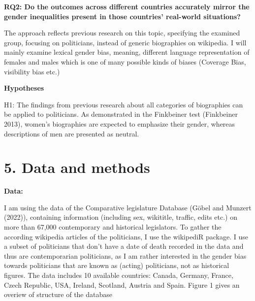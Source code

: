 \documentclass[
]{article}
\begin{document}
\textbf{RQ2: Do the outcomes across different countries accurately
mirror the gender inequalities present in those countries' real-world
situations?}

The approach reflects previous research on this topic, specifying the
examined group, focusing on politicians, instead of generic biographies
on wikipedia. I will mainly examine lexical gender bias, meaning,
different language representation of females and males which is one of
many possible kinds of biases (Coverage Bias, visibility bias etc.)

\textbf{Hypotheses}

H1: The findings from previous research about all categories of
biographies can be applied to politicians. As demonstrated in the
Finkbeiner test (Finkbeiner 2013), women's biographies are expected to
emphasize their gender, whereas descriptions of men are presented as
neutral.

\hypertarget{data-and-methods}{%
\section{5. Data and methods}\label{data-and-methods}}

\textbf{Data:}

I am using the data of the Comparative legislature Database (Göbel and
Munzert (2022)), containing information (including sex, wikititle,
traffic, edits etc.) on more than 67,000 contemporary and historical
legislators. To gather the according wikipedia articles of the
politicians, I use the wikipediR package. I use a subset of politicians
that don't have a date of death recorded in the data and thus are
contemporarian politicians, as I am rather interested in the gender bias
towards politicians that are known as (acting) politicians, not as
historical figures. The data includes 10 available countries: Canada,
Germany, France, Czech Republic, USA, Ireland, Scotland, Austria and
Spain. Figure 1 gives an overiew of structure of the database
\end{document}
